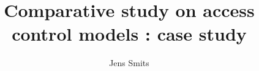 \documentclass[a4paper,12pt]{report}
\title{Comparative study on access control models : case study}
\author{Jens Smits}
\begin{document}
\frontpages



\mainbodypages






\backpages

\begin{appendices}


%
\end{appendices}

\end{document}
